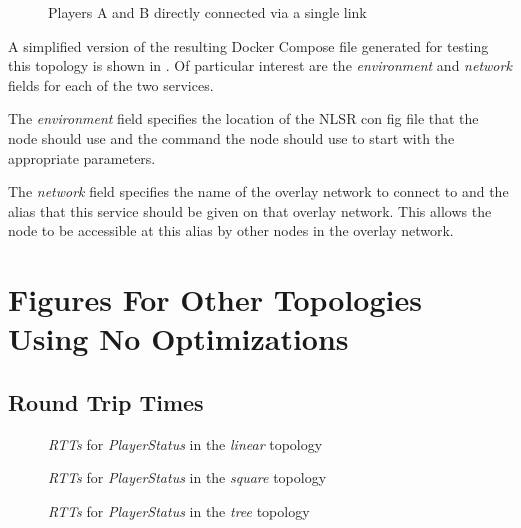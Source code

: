 \begin{appendices}
\begin{figure}[H]
    \centering
    \caption{Players A and B directly connected via a single link}
    \label{fig:app:docker-l2}
\end{figure}

A simplified version of the resulting Docker Compose file generated for testing this topology is shown in . Of particular interest are the \textit{environment} and \textit{network} fields for each of the two services. 

The \textit{environment} field specifies the location of the NLSR con fig file that the node should use and the command the node should use to start \game{} with the appropriate parameters.

The \textit{network} field specifies the name of the overlay network to connect to and the alias that this service should be given on that overlay network. This allows the node to be accessible at this alias by other nodes in the overlay network.







\chapter{Figures For Other Topologies Using No Optimizations}\label{app:eval:basic}
\section{Round Trip Times}
\begin{figure}[H]
    \centering
    \caption{\textit{RTTs} for \textit{PlayerStatus} in the \textit{linear} topology}
    \label{fig:app:rtt:linear}
\end{figure}

\begin{figure}[H]
    \centering
    \caption{\textit{RTTs} for \textit{PlayerStatus} in the \textit{square} topology}
    \label{fig:app:rtt:square}
\end{figure}

\begin{figure}[H]
    \centering
    \caption{\textit{RTTs} for \textit{PlayerStatus} in the \textit{tree} topology}
    \label{fig:app:rtt:tree}
\end{figure}


\end{appendices}
